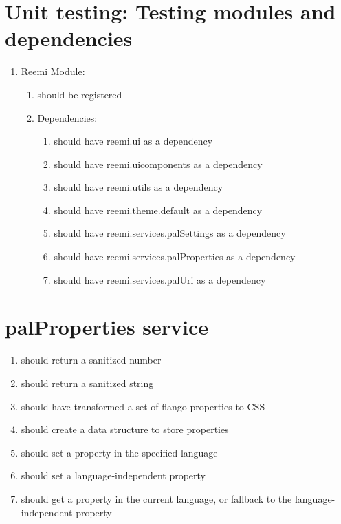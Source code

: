 \begin{singlespace}
\section{Unit testing: Testing modules and dependencies}
\begin{enumerate}
\item     Reemi Module:
\begin{enumerate}
\item         should be registered
\item         Dependencies:
\begin{enumerate}
\item             should have reemi.ui as a dependency
\item             should have reemi.uicomponents as a dependency
\item             should have reemi.utils as a dependency
\item             should have reemi.theme.default as a dependency
\item             should have reemi.services.palSettings as a dependency
\item             should have reemi.services.palProperties as a dependency
\item             should have reemi.services.palUri as a dependency
\end{enumerate}
\end{enumerate}
\end{enumerate}

\section{palProperties service}
\begin{enumerate}
\item         should return a sanitized number
\item         should return a sanitized string
\item         should have transformed a set of flango properties to CSS
\item         should create a data structure to store properties
\item         should set a property in the specified language
\item         should set a language-independent property
\item         should get a property in the current language, or fallback to the language-independent property
\end{enumerate}


\end{singlespace}
